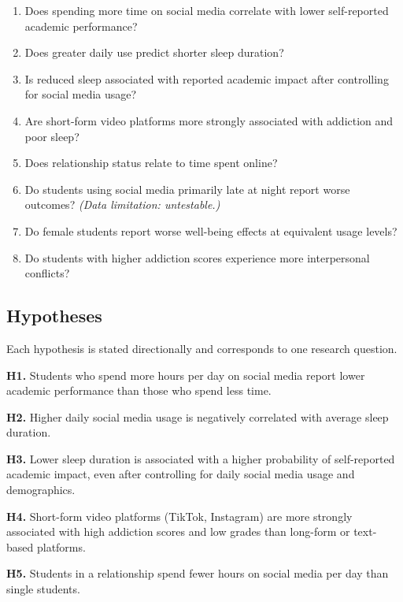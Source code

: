 \documentclass[10pt]{article}
\begin{document}
\begin{enumerate}[label=\textbf{RQ\arabic*.}]
  \item Does spending more time on social media correlate with lower
        self-reported academic performance?
  \item Does greater daily use predict shorter sleep duration?
  \item Is reduced sleep associated with reported academic impact after
        controlling for social media usage?
  \item Are short-form video platforms more strongly associated with addiction
        and poor sleep?
  \item Does relationship status relate to time spent online?
  \item Do students using social media primarily late at night report worse
        outcomes? \textit{(Data limitation: untestable.)}
  \item Do female students report worse well-being effects at equivalent usage
        levels?
  \item Do students with higher addiction scores experience more interpersonal
        conflicts?
\end{enumerate}

\subsection{Hypotheses}

Each hypothesis is stated directionally and corresponds to one research
question.

\medskip
\noindent\textbf{H1.} Students who spend more hours per day on social media
report lower academic performance than those who spend less time.

\medskip
\noindent\textbf{H2.} Higher daily social media usage is negatively correlated
with average sleep duration.

\medskip
\noindent\textbf{H3.} Lower sleep duration is associated with a higher
probability of self-reported academic impact, even after controlling for daily
social media usage and demographics.

\medskip
\noindent\textbf{H4.} Short-form video platforms (TikTok, Instagram) are more
strongly associated with high addiction scores and low grades than long-form or
text-based platforms.

\medskip
\noindent\textbf{H5.} Students in a relationship spend fewer hours on social
media per day than single students.
\end{document}
